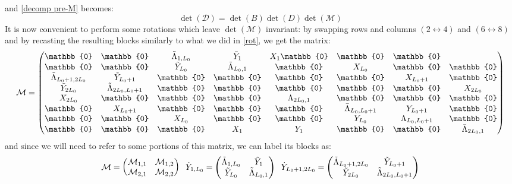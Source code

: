 and \eqref{decomp pre-M} becomes:
\begin{equation}
    \det(\mathcal{D}) = \det(B) \det(D) \det(\mathcal{M})
\end{equation}
It is now convenient to perform some rotations which leave $\det(\mathcal{M})$ invariant: by swapping rows and columns $(2 \leftrightarrow 4)$ and $(6 \leftrightarrow 8)$ and by recasting the resulting blocks similarly to what we did in \eqref{rot}, we get the matrix:
\begin{equation}
    \mathcal{M} = \begin{pmatrix}
         \mathbb{0} & \mathbb{0} & \Tilde{\Lambda}_{1, L_0} & \Tilde{Y}_1 & X_1  \mathbb{0}  & \mathbb{0} & \mathbb{0}  \\
        \mathbb{0} & \mathbb{0} & \Tilde{Y}_{L_0} & \Tilde{\Lambda}_{L_0, 1}  & \mathbb{0} & X_{L_0} & \mathbb{0}  & \mathbb{0} \\
        \Tilde{\Lambda}_{L_0 + 1, 2L_0} & \Tilde{Y}_{L_0 + 1} & \mathbb{0} & \mathbb{0}  & \mathbb{0} & \mathbb{0} & X_{L_0 + 1}  & \mathbb{0} \\
        \Tilde{Y}_{2L_0} &  \Tilde{\Lambda}_{2L_0, L_0 + 1} & \mathbb{0} & \mathbb{0} & \mathbb{0} & \mathbb{0} & \mathbb{0} & X_{2L_0} \\
        X_{2L_0} & \mathbb{0} & \mathbb{0} & \mathbb{0} & \Lambda_{2L_0, 1} & \mathbb{0} & \mathbb{0} & \mathbb{0} \\
        \mathbb{0} & X_{L_0 + 1} & \mathbb{0} & \mathbb{0} & \mathbb{0} & \Bar{\Lambda}_{L_0, L_0 + 1} & Y_{L_0 + 1} & \mathbb{0} \\
        \mathbb{0} & \mathbb{0} & X_{L_0} & \mathbb{0} & \mathbb{0} & Y_{L_0} & \Lambda_{L_0, L_0 + 1} & \mathbb{0} \\
        \mathbb{0} & \mathbb{0} & \mathbb{0} & X_1 & Y_1 & \mathbb{0} & \mathbb{0} & \Bar{\Lambda}_{2L_0, 1} \\
    \end{pmatrix}
\end{equation}
and since we will need to refer to some portions of this matrix, we can label its blocks as:
\begin{equation}
    \mathcal{M} = \begin{pmatrix}
        \mathcal{M}_{1,1} &  \mathcal{M}_{1,2} \\ 
         \mathcal{M}_{2,1} &  \mathcal{M}_{2,2} \\
    \end{pmatrix} \hspace{2mm} \Dot{Y}_{1, L_0} = \begin{pmatrix}
        \Tilde{\Lambda}_{1, L_0} & \Tilde{Y}_1 \\
        \Tilde{Y}_{L_0} & \Tilde{\Lambda}_{L_0, 1} \\
    \end{pmatrix} \hspace{2mm} \Dot{Y}_{L_0 + 1, 2L_0} = \begin{pmatrix}
        \Tilde{\Lambda}_{L_0 + 1, 2L_0} & \Tilde{Y}_{L_0 + 1} \\
        \Tilde{Y}_{2L_0} & \Tilde{\Lambda}_{2L_0, L_0 + 1} \\
    \end{pmatrix}
\end{equation}
